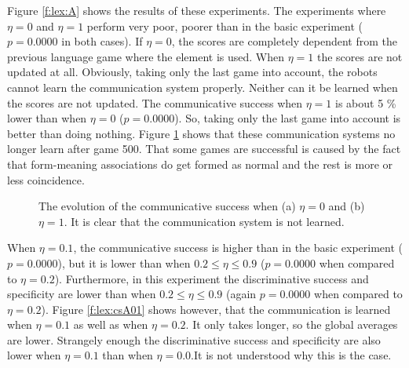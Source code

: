 Figure \ref{f:lex:A} shows the results of these experiments. The experiments where $\eta=0$ and $\eta=1$ perform very poor, poorer than in the basic experiment ($p=0.0000$ in both cases). If $\eta=0$, the scores are completely dependent from the previous language game where the element is used. When $\eta=1$ the scores are not updated at all. Obviously, taking only the last game into account, the robots cannot learn the communication system properly. Neither can it be learned when the scores are not updated. The communicative success when $\eta=1$ is about 5 \% lower than when $\eta=0$ ($p=0.0000$). So, taking only the last game into account is better than doing nothing. Figure \ref{f:lex:csA0} shows that these communication systems no longer learn after game 500. That some games are successful is caused by the fact that form-meaning associations do get formed as normal and the rest is more or less coincidence.

\begin{figure}[t]
\centering
{}
\caption{The evolution of the communicative success when (a) $\eta=0$ and (b) $\eta=1$. It is clear that the communication system is not learned.}
\label{f:lex:csA0}
\end{figure}

When $\eta=0.1$, the communicative success is higher than in the basic experiment ($p=0.0000$), but it is lower than when $0.2\leq\eta\leq0.9$ ($p=0.0000$ when compared to $\eta=0.2$). Furthermore, in this experiment the discriminative success and specificity are lower than when $0.2\leq\eta\leq0.9$ (again $p=0.0000$ when compared to $\eta=0.2$). Figure \ref{f:lex:csA01} shows however, that the communication is learned when $\eta=0.1$ as well as when $\eta=0.2$. It only takes longer, so the global averages are lower. Strangely enough the discriminative success and specificity are also lower when $\eta=0.1$ than when $\eta=0.0$.It is not understood why this is the case.

